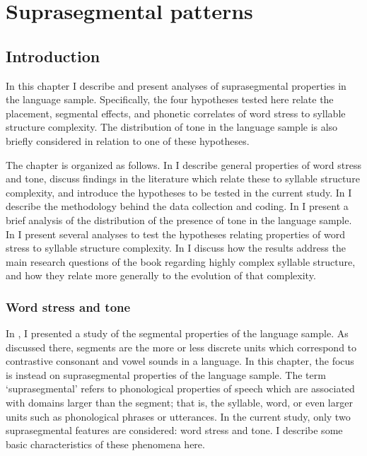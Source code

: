 \chapter{Suprasegmental patterns}\label{sec:5}
\section{{Introduction}}\label{sec:5.1}

  In this chapter I describe and present analyses of suprasegmental properties in the language sample. Specifically, the four hypotheses tested here relate the placement, segmental effects, and phonetic correlates of word stress to syllable structure complexity. The distribution of tone in the language sample is also briefly considered in relation to one of these hypotheses.

  The chapter is organized as follows. In  I describe general properties of word stress and tone, discuss findings in the literature which relate these to syllable structure complexity, and introduce the hypotheses to be tested in the current study. In  I describe the methodology behind the data collection and coding. In  I present a brief analysis of the distribution of the presence of tone in the language sample. In  I present several analyses to test the hypotheses relating properties of word stress to syllable structure complexity. In  I discuss how the results address the main research questions of the book regarding highly complex syllable structure, and how they relate more generally to the evolution of that complexity.

\subsection{Word stress and tone}\label{sec:5.1.1}

  In , I presented a study of the segmental properties of the language sample. As discussed there, segments are the more or less discrete units which correspond to contrastive consonant and vowel sounds in a language. In this chapter, the focus is instead on suprasegmental properties of the language sample. The term ‘suprasegmental’ refers to phonological properties of speech which are associated with domains larger than the segment; that is, the syllable, word, or even larger units such as phonological phrases or utterances. In the current study, only two suprasegmental features are considered: word stress and tone. I describe some basic characteristics of these phenomena here.

